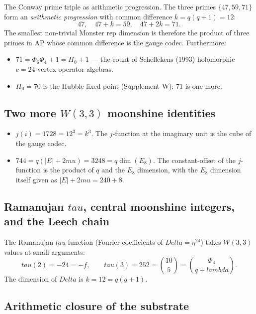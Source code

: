 \documentclass[11pt]{article}
\def\textbf#1{#1}%
\def\Delta{Delta}%
\def\lambda{lambda}%
\def\mu{mu}%
\def\Phi#1{Phi#1}%
\def\tau{tau}%
\def\cdot{ }%
\begin{document}
\textbf{The Conway prime triple as arithmetic progression.} The three primes $\{47, 59, 71\}$ form an \emph{arithmetic progression} with common difference $k = q(q+1) = 12$:
\[
47, \quad 47 + k = 59, \quad 47 + 2k = 71.
\]
The smallest non-trivial Monster rep dimension is therefore the product of three primes in AP whose common difference is the gauge codec. Furthermore:
\begin{itemize}[leftmargin=2em]
\item $71 = \Phi_6 \cdot \Phi_4 + 1 = H_0 + 1$ --- the count of Schellekens (1993) holomorphic $c = 24$ vertex operator algebras.
\item $H_0 = 70$ is the Hubble fixed point (Supplement W); $71$ is one more.
\end{itemize}

\subsection*{Two more $W(3,3)$ moonshine identities}

\begin{itemize}[leftmargin=2em]
\item $j(i) = 1728 = 12^3 = k^3$. The $j$-function at the imaginary unit is the cube of the gauge codec.
\item $744 = q \cdot (|E| + 2\mu) = 3 \cdot 248 = q \cdot \dim(E_8)$. The constant-offset of the $j$-function is the product of $q$ and the $E_8$ dimension, with the $E_8$ dimension itself given as $|E| + 2\mu = 240 + 8$.
\end{itemize}

\subsection*{Ramanujan $\tau$, central moonshine integers, and the Leech chain}

The Ramanujan $\tau$-function (Fourier coefficients of $\Delta = \eta^{24}$) takes $W(3,3)$ values at small arguments:
\[
\tau(2) = -24 = -f, \qquad \tau(3) = 252 = \binom{10}{5} = \binom{\Phi_4}{q+\lambda}.
\]
The dimension of $\Delta$ is $k = 12 = q(q+1)$.

\subsection*{Arithmetic closure of the substrate}
\end{document}
